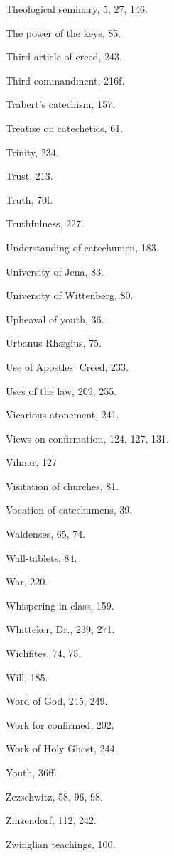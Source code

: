 \begin{originalinhalt}
Theological seminary, 5, 27, 146.

The power of the keys, 85.

Third article of creed, 243.

Third commandment, 216f.

Trabert’s catechism, 157.

Treatise on catechetics, 61.

Trinity, 234.

Trust, 213.

Truth, 70f.

Truthfulness, 227.


Understanding of catechumen, 183.

University of Jena, 83.

University of Wittenberg, 80.

Upheaval of youth, 36.

Urbanus Rhægius, 75.

Use of Apostles’ Creed, 233.

Uses of the law, 209, 255.


Vicarious atonement, 241.

Views on confirmation, 124, 127, 131.

Vilmar, 127

Visitation of churches, 81.

Vocation of catechumens, 39.


Waldenses, 65, 74.

Wall-tablets, 84.

War, 220.

Whispering in class, 159.

Whitteker, Dr., 239, 271.

Wiclifites, 74, 75.

Will, 185.

Word of God, 245, 249.

Work for confirmed, 202.

Work of Holy Ghost, 244.


Youth, 36ff.


Zezschwitz, 58, 96, 98.

Zinzendorf, 112, 242.

Zwinglian teachings, 100.
\end{originalinhalt}
